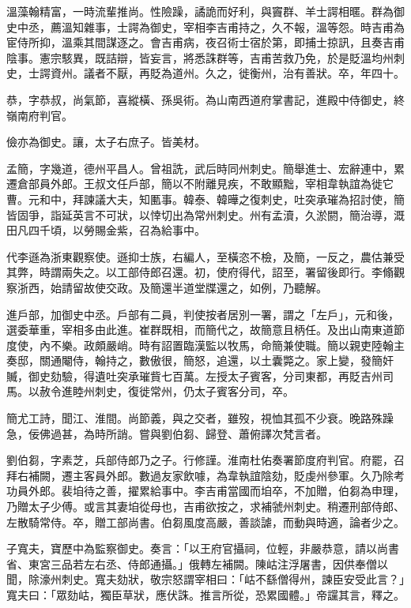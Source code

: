 \begin{pinyinscope}
 溫藻翰精富，一時流輩推尚。性險躁，譎詭而好利，與竇群、羊士諤相暱。群為御史中丞，薦溫知雜事，士諤為御史，宰相李吉甫持之，久不報，溫等怨。時吉甫為宦侍所抑，溫乘其間謀逐之。會吉甫病，夜召術士宿於第，即捕士掠訊，且奏吉甫陰事。憲宗駭異，既詰辯，皆妄言，將悉誅群等，吉甫苦救乃免，於是貶溫均州刺史，士諤資州。議者不厭，再貶為道州。久之，徙衡州，治有善狀。卒，年四十。



 恭，字恭叔，尚氣節，喜縱橫、孫吳術。為山南西道府掌書記，進殿中侍御史，終嶺南府判官。



 儉亦為御史。讓，太子右庶子。皆美材。



 孟簡，字幾道，德州平昌人。曾祖詵，武后時同州刺史。簡舉進士、宏辭連中，累遷倉部員外郎。王叔文任戶部，簡以不附離見疾，不敢顯黜，宰相韋執誼為徙它曹。元和中，拜諫議大夫，知匭事。韓泰、韓曄之復刺史，吐突承璀為招討使，簡皆固爭，詣延英言不可狀，以悻切出為常州刺史。州有孟瀆，久淤閼，簡治導，溉田凡四千頃，以勞賜金紫，召為給事中。



 代李遜為浙東觀察使。遜抑士族，右編人，至橫恣不檢，及簡，一反之，農估兼受其弊，時謂兩失之。以工部侍郎召還。初，使府得代，詔至，署留後即行。李翛觀察浙西，始請留故使交政。及簡還半道堂牒還之，如例，乃聽解。



 進戶部，加御史中丞。戶部有二員，判使按者居別一署，謂之「左戶」，元和後，選委華重，宰相多由此進。崔群既相，而簡代之，故簡意且柄任。及出山南東道節度使，內不樂。政頗嚴峭。時有詔置臨漢監以牧馬，命簡兼使職。簡以親吏陸翰主奏邸，關通閹侍，翰持之，數傲很，簡怒，追還，以土囊斃之。家上變，發簡奸贓，御史劾驗，得遺吐突承璀貲七百萬。左授太子賓客，分司東都，再貶吉州司馬。以赦令進睦州刺史，復徙常州，仍太子賓客分司，卒。



 簡尤工詩，聞江、淮間。尚節義，與之交者，雖歿，視恤其孤不少衰。晚路殊躁急，佞佛過甚，為時所誚。嘗與劉伯芻、歸登、蕭俯譯次梵言者。



 劉伯芻，字素芝，兵部侍郎乃之子。行修謹。淮南杜佑奏署節度府判官。府罷，召拜右補闕，遷主客員外郎。數過友家飲噱，為韋執誼陰劾，貶虔州參軍。久乃除考功員外郎。裴垍待之善，擢累給事中。李吉甫當國而垍卒，不加贈，伯芻為申理，乃贈太子少傅。或言其妻垍從母也，吉甫欲按之，求補虢州刺史。稍遷刑部侍郎、左散騎常侍。卒，贈工部尚書。伯芻風度高嚴，善談謔，而動與時適，論者少之。



 子寬夫，寶歷中為監察御史。奏言：「以王府官攝祠，位輕，非嚴恭意，請以尚書省、東宮三品若左右丞、侍郎通攝。」俄轉左補闕。陳岵注浮屠書，因供奉僧以聞，除濠州刺史。寬夫劾狀，敬宗怒謂宰相曰：「岵不繇僧得州，諫臣安受此言？」寬夫曰：「眾劾岵，獨臣草狀，應伏誅。推言所從，恐累國體。」帝讜其言，釋之。




\end{pinyinscope}
